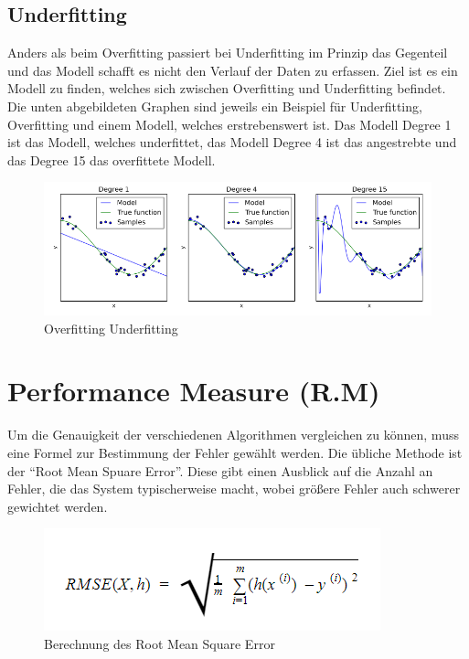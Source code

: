 \subsection{Underfitting}
\label{sec:underfitting}
Anders als beim Overfitting passiert bei Underfitting im Prinzip das Gegenteil und das Modell schafft es nicht den Verlauf der Daten zu erfassen\cite[S.~214.]{WML}.
Ziel ist es ein Modell zu finden, welches sich zwischen Overfitting und Underfitting befindet. Die unten abgebildeten Graphen sind jeweils ein Beispiel für Underfitting, Overfitting und einem Modell, welches erstrebenswert ist. Das Modell Degree 1 ist das Modell, welches underfittet, das Modell Degree 4 ist das angestrebte und das Degree 15 das overfittete Modell.
\newline
\begin{figure}
	\includegraphics[width=1.0\textwidth]{../Bilder/OverUnderfitting.PNG}
	\caption{Overfitting Underfitting}
\end{figure}


\section{Performance Measure (R.M)}
\label{sec:performanceMeasure}
Um die Genauigkeit der verschiedenen Algorithmen vergleichen zu können, muss eine Formel zur Bestimmung der Fehler gewählt werden. 
Die übliche Methode ist der “Root Mean Spuare Error”. Diese gibt einen Ausblick auf die Anzahl an Fehler, die das System typischerweise macht, wobei größere Fehler auch schwerer gewichtet werden\cite[S.~39.]{AG}.
\newline
\begin{figure}
	\includegraphics[]{../Bilder/Berechnung.PNG}
	\caption{Berechnung des Root Mean Square Error}
\end{figure}


